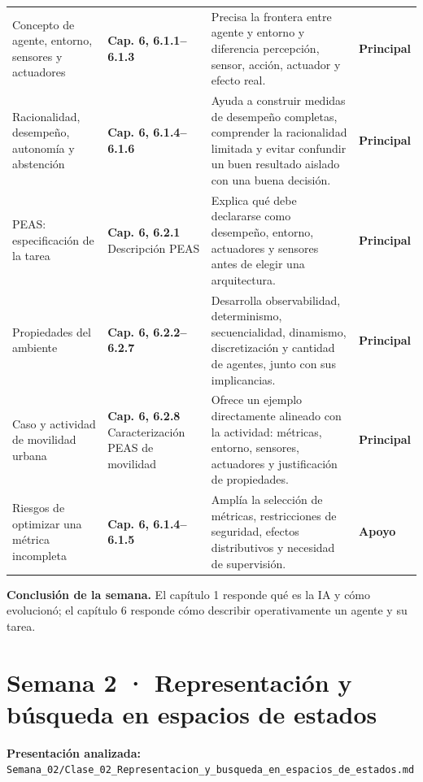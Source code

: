 \documentclass[10pt,a4paper]{article}
\newcommand{\capitulo}[1]{\textbf{\color{UAPTeal}#1}}
\newcommand{\principal}{\textbf{Principal}}
\newcommand{\apoyo}{\textbf{Apoyo}}
\begin{document}
\begin{longtable}{P{3.35cm}P{4.05cm}P{6.25cm}P{2.15cm}}
Concepto de agente, entorno, sensores y actuadores & \capitulo{Cap. 6, 6.1.1--6.1.3} & Precisa la frontera entre agente y entorno y diferencia percepción, sensor, acción, actuador y efecto real. & \principal \\
Racionalidad, desempeño, autonomía y abstención & \capitulo{Cap. 6, 6.1.4--6.1.6} & Ayuda a construir medidas de desempeño completas, comprender la racionalidad limitada y evitar confundir un buen resultado aislado con una buena decisión. & \principal \\
PEAS: especificación de la tarea & \capitulo{Cap. 6, 6.2.1} Descripción PEAS & Explica qué debe declararse como desempeño, entorno, actuadores y sensores antes de elegir una arquitectura. & \principal \\
Propiedades del ambiente & \capitulo{Cap. 6, 6.2.2--6.2.7} & Desarrolla observabilidad, determinismo, secuencialidad, dinamismo, discretización y cantidad de agentes, junto con sus implicancias. & \principal \\
Caso y actividad de movilidad urbana & \capitulo{Cap. 6, 6.2.8} Caracterización PEAS de movilidad & Ofrece un ejemplo directamente alineado con la actividad: métricas, entorno, sensores, actuadores y justificación de propiedades. & \principal \\
Riesgos de optimizar una métrica incompleta & \capitulo{Cap. 6, 6.1.4--6.1.5} & Amplía la selección de métricas, restricciones de seguridad, efectos distributivos y necesidad de supervisión. & \apoyo \\
\bottomrule
\end{longtable}

\textbf{Conclusión de la semana.} El capítulo 1 responde qué es la IA y cómo evolucionó; el capítulo 6 responde cómo describir operativamente un agente y su tarea.

\section*{Semana 2 · Representación y búsqueda en espacios de estados}

\textbf{Presentación analizada:} \texttt{Semana\_02/Clase\_02\_Representacion\_y\_busqueda\_en\_espacios\_de\_estados.md}
\end{document}
